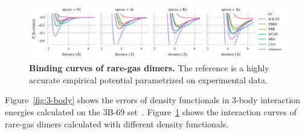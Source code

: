 \documentclass[twocolumn]{article}
\begin{document}
\begin{figure}
\includegraphics[center]{../media/mbd-rare-gas}
\caption{\textbf{Binding curves of rare-gas dimers.}
The reference is a highly accurate empirical potential parametrized on experimental data.
}\label{fig:mbd-rare-gas}
\end{figure}

Figure~\ref{fig:3-body} shows the errors of density functionals in 3-body interaction energies calculated on the 3B-69 set~\cite{RezacJCTC15}.
Figure~\ref{fig:mbd-rare-gas} shows the interaction curves of rare-gas dimers calculated with different density functionals.

\begingroup
\renewcommand{\section}[2]{}
\setlength\bibsep{0pt}
\footnotesize

\endgroup
\end{document}
